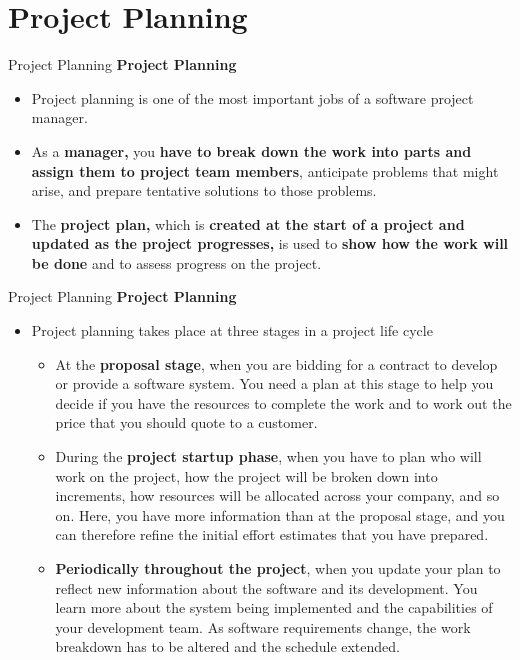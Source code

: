 \documentclass{beamer}
\begin{document}
\section{Project Planning }
\begin{frame}{Project Planning}
	\textbf{Project Planning}
\begin{itemize}
	\item Project planning is one of the most important jobs of a software project manager. 
	\item As a \textbf{manager,} you \textbf{have to break down the work into parts and assign them to project team members}, anticipate problems that might arise, and prepare tentative solutions to those problems. 
	\item The \textbf{project plan,} which is\textbf{ created at the start of a project and updated as the project progresses,} is used to\textbf{ show how the work will be done} and to assess progress on the project. 
\end{itemize}
\end{frame}
\begin{frame}{Project Planning}
	\textbf{Project Planning}
	\begin{itemize}
		\item Project planning takes place at three stages in a project life cycle
		\begin{itemize}
			\item At the \textbf{proposal stage}, when you are bidding for a contract to develop or provide a software system. You need a plan at this stage to help you decide if you have the resources to complete the work and to work out the price that you should quote to a customer. 
			\item During the \textbf{project startup phase}, when you have to plan who will work on the project, how the project will be broken down into increments, how resources will be allocated across your company, and so on. Here, you have more information than at the proposal stage, and you can therefore refine the initial effort estimates that you have prepared. 
			\item \textbf{Periodically throughout the project}, when you update your plan to reflect new information about the software and its development. You learn more about the system being implemented and the capabilities of your development team. As software requirements change, the work breakdown has to be altered and the schedule extended. 
		\end{itemize}
	\end{itemize}
\end{frame}
\end{document}
